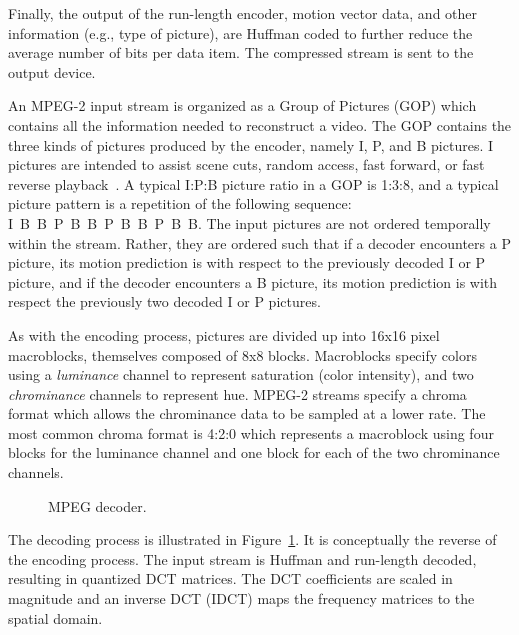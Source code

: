 Finally, the output of the run-length encoder, motion vector data,
and other information (e.g., type of picture), are Huffman coded to 
further reduce the average number of bits per data item. The compressed
stream is sent to the output device.


An MPEG-2 input stream is organized as a Group of Pictures (GOP)
which contains all the information needed to reconstruct a video. The
GOP contains the three kinds of pictures produced by the encoder,
namely I, P, and B pictures. I pictures are intended to assist scene
cuts, random access, fast forward, or fast reverse
playback~\cite{MPEG2, Page 14 6.1.1.7}. A typical I:P:B picture ratio
in a GOP is 1:3:8, and a typical picture pattern is a
repetition of the following sequence: I~B~B~P~B~B~P~B~B~P~B~B. The
input pictures are not ordered temporally within the stream. Rather,
they are ordered such that if a decoder encounters a P picture, its
motion prediction is with respect to the previously decoded I or P
picture, and if the decoder encounters a B picture, its motion
prediction is with respect the previously two decoded I or P pictures.

As with the encoding process, pictures are divided up into 16x16 pixel
macroblocks, themselves composed of 8x8 blocks. Macroblocks
specify colors using a {\it luminance} channel to represent saturation
(color intensity), and two {\it chrominance} channels to represent
hue. MPEG-2 streams specify a chroma format which allows the
chrominance data to be sampled at a lower rate. The most common chroma 
format is 4:2:0 which represents a macroblock using four blocks for the
luminance channel and one block for each of the two chrominance
channels. 

\begin{figure}[t]
\begin{center}
\vspace{-12pt}
 \caption{MPEG decoder.}
 \label{fig:mpeg-decoder}
\end{center}
\end{figure}

The decoding process is illustrated in
Figure~\ref{fig:mpeg-decoder}. It is conceptually the reverse of the
encoding process. The input stream is Huffman and run-length decoded,
resulting in quantized DCT matrices. The DCT coefficients are scaled
in magnitude and an inverse DCT (IDCT) maps the frequency matrices to
the spatial domain.


